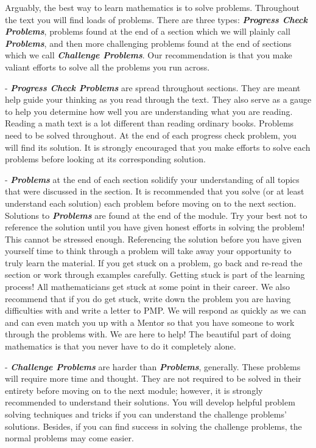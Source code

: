 \documentclass{amsart}
\numberwithin{equation}{section}
\theoremstyle{plain} %
\theoremstyle{definition}
\theoremstyle{remark}
\begin{document}
 Arguably, the best way to learn mathematics is to solve problems. Throughout the text you will find loads of problems. There are three types:
 \textbf{\textit{Progress Check Problems}}, problems found at the end of a section which we will plainly call \textbf{\textit{Problems}},
 and then more challenging problems found at the end of sections which we call \textbf{\textit{Challenge Problems}}.
 Our recommendation is that you make valiant efforts to solve all the problems you run across. 
 
 - \textbf{\textit{Progress Check Problems}} are spread throughout sections. They are meant help guide your thinking as you read through the text.
 They also serve as a gauge to help you determine how well you are understanding what you are reading. Reading a math text is a lot different than 
 reading ordinary books. Problems need to be solved throughout. At the end of each progress check problem, you will find its solution.
 It is strongly encouraged that you make efforts to solve each problems before looking at its corresponding solution.

-  \textbf{\textit{Problems}} at the end of each section solidify your understanding of all topics that were discussed in the section.
It is recommended that you solve (or at least understand each solution) each problem before moving on to the next section. Solutions to \textbf{\textit{Problems}} 
are found at the end of the module. Try your best not to reference the solution until you have given honest efforts in solving the problem! This cannot be stressed enough.
Referencing the solution before you have given yourself time to think through a problem will take away your opportunity to truly learn the material.
If you get stuck on a problem, go back and re-read the section or work through examples carefully. Getting stuck is part of the learning process!
All mathematicians get stuck at some point in their career. We also recommend that if you do get stuck, write down the problem you are having difficulties with and write a letter to PMP.
We will respond as quickly as we can and can even match you up with a Mentor so that you have someone to work through the problems with. We are here to help!
The beautiful part of doing mathematics is that you never have to do it completely alone.

- \textbf{\textit{Challenge Problems}} are harder than \textbf{\textit{Problems}}, generally. These problems will require more time and thought.
They are not required to be solved in their entirety before moving on to the next module; however, it is strongly recommended to understand their solutions.
You will develop helpful problem solving techniques and tricks if you can understand the challenge problems' solutions. Besides,
if you can find success in solving the challenge problems, the normal problems may come easier.
\end{document}
